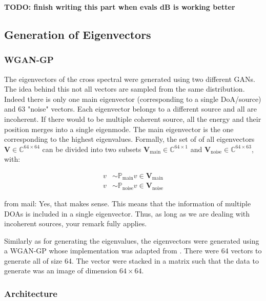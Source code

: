 \documentclass{article}
\begin{document}
\textbf{TODO: finish writing this part when evals dB is working better}


\subsection{Generation of Eigenvectors}

\subsubsection{WGAN-GP}

The eigenvectors of the cross spectral were generated using two different GANs. The idea behind this not all vectors are sampled from the same distribution. Indeed there is only one main eigenvector (corresponding to a single DoA/source) and 63 "noise" vectors.  Each eigenvector belongs to a different source and all are incoherent. If there would to be  multiple coherent source, all the energy and their position merges into a single eigenmode. The main eigenvector is the one corresponding to the highest eigenvalues. Formally, the set of of all eigenvectors $\mathbf{V} \in \mathbb{C}^{64 \times 64}$ can be divided into two subsets $\mathbf{V}_{\text{main}} \in \mathbb{C}^{64 \times 1}$ and $\mathbf{V}_{\text{noise}} \in \mathbb{C}^{64 \times 63}$, with:

\begin{align}
    v &\sim \mathbb{P}_{\text{main}}  v \in  \mathbf{V}_{\text{main}}\\
    v &\sim \mathbb{P}_{\text{noise}}  v \in  \mathbf{V}_{\text{noise}}
\end{align}
 



from mail:
Yes, that makes sense. This  means that the information of multiple DOAs is included in a single eigenvector. Thus, as long as we are dealing with incoherent sources, your remark fully applies.




Similarly as for generating the eigenvalues, the eigenvectors were generated using a WGAN-GP whose implementation was adapted from \cite{nain2020wgangp}. There were 64 vectors to generate all of size 64. The vector were stacked in a matrix such that the data to generate was an image of dimension $64 \times 64$.



\subsubsection{Architecture}
\end{document}
